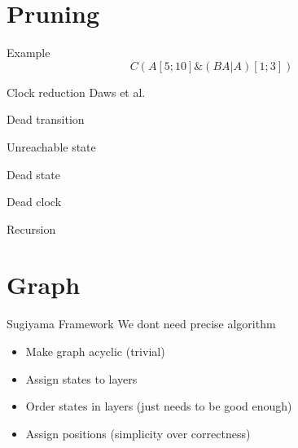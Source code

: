 \section{Pruning}
\begin{frame}{Example}
    $$C(A[5;10]\&(BA|A)[1;3])$$
    
\end{frame}
\begin{frame}{Clock reduction}
    Daws et al.
    
\end{frame}
\begin{frame}{Dead transition}
    
    
\end{frame}
\begin{frame}{Unreachable state}
    
    
\end{frame}
\begin{frame}{Dead state}
    
    
\end{frame}
\begin{frame}{Dead clock}
    
    
\end{frame}
\begin{frame}{Recursion}
    
    
\end{frame}

\begin{frame}
    
    
\end{frame}

\section{Graph}
\begin{frame}{Sugiyama Framework}
    We dont need precise algorithm
    \begin{itemize}
        \item Make graph acyclic (trivial)
        \item Assign states to layers
        \item Order states in layers (just needs to be good enough)
        \item Assign positions (simplicity over correctness)
    \end{itemize}
\end{frame}

